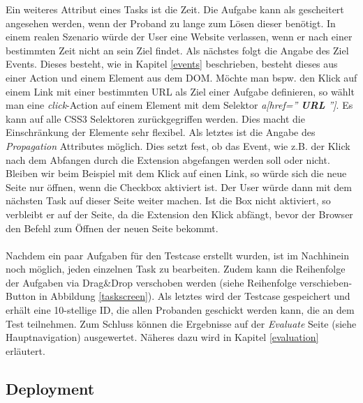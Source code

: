 \label{targetElem}
Ein weiteres Attribut eines Tasks ist die Zeit. Die Aufgabe kann als gescheitert angesehen werden, wenn der Proband zu lange zum Lösen dieser benötigt. In einem realen Szenario würde der User eine Website verlassen, wenn er nach einer bestimmten Zeit nicht an sein Ziel findet. Als nächstes folgt die Angabe des Ziel Events. Dieses besteht, wie in Kapitel \ref{events} beschrieben, besteht dieses aus einer Action und einem Element aus dem DOM. Möchte man bspw. den Klick auf einem Link mit einer bestimmten URL als Ziel einer Aufgabe definieren, so wählt man eine \textit{click}-Action auf einem Element mit dem Selektor \textit{a[href=''\textbf{ URL }'']}. Es kann auf alle CSS3 Selektoren zurückgegriffen werden. Dies macht die Einschränkung der Elemente sehr flexibel. Als letztes ist die Angabe des \textit{Propagation} Attributes möglich. Dies setzt fest, ob das Event, wie z.B. der Klick nach dem Abfangen durch die Extension abgefangen werden soll oder nicht. Bleiben wir beim Beispiel mit dem Klick auf einen Link, so würde sich die neue Seite nur öffnen, wenn die Checkbox aktiviert ist. Der User würde dann mit dem nächsten Task auf dieser Seite weiter machen. Ist die Box nicht aktiviert, so verbleibt er auf der Seite, da die Extension den Klick abfängt, bevor der Browser den Befehl zum Öffnen der neuen Seite bekommt.\\
\\
Nachdem ein paar Aufgaben für den Testcase erstellt wurden, ist im Nachhinein noch möglich, jeden einzelnen Task zu bearbeiten. Zudem kann die Reihenfolge der Aufgaben via Drag\&Drop verschoben werden (siehe \glqq Reihenfolge verschieben\grqq{}-Button in Abbildung \ref{taskscreen}). Als letztes wird der Testcase gespeichert und erhält eine 10-stellige ID, die allen Probanden geschickt werden kann, die an dem Test teilnehmen. Zum Schluss können die Ergebnisse auf der \textit{Evaluate} Seite (siehe Hauptnavigation) ausgewertet. Näheres dazu wird in Kapitel \ref{evaluation} erläutert.


\subsection{Deployment}

